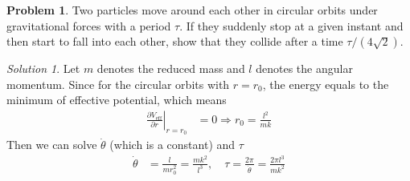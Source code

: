\documentclass[twoside,11pt]{article}
\newcommand{\lms}{\fontfamily{lmss}\selectfont} %
\theoremstyle{definition}
\newtheorem{problem}{\lms Problem}
\theoremstyle{remark}
\newtheorem*{solution}{\lms Solution}
\begin{document}
\begin{problem}
Two particles move around each other in circular orbits under gravitational
forces with a period $\tau$. If they suddenly stop at a given instant and then start to fall into each
other, show that they collide after a time $\tau/(4\sqrt{2})$.
\end{problem}
\begin{solution}
Let $m$ denotes the reduced mass and $l$ denotes the angular momentum.
Since for the circular orbits with $r=r_0$, 
the energy equals to the minimum of effective potential, which means
\begin{align*}
    \left. \frac{\partial V_\text{eff}}{\partial r} \right|_{r=r_0}
    &= 0
    \Rightarrow 
    r_0 = \frac{l^2}{mk}
\end{align*}
Then we can solve $\dot\theta$ (which is a constant) and $\tau$
\begin{align*}
    \dot\theta &= 
    \frac{l}{mr_0^2} = \frac{mk^2}{l^3},\quad
    \tau = \frac{2\pi}{\dot\theta}
    = \frac{2\pi l^3}{mk^2}
\end{align*}


\end{solution}
\end{document}
